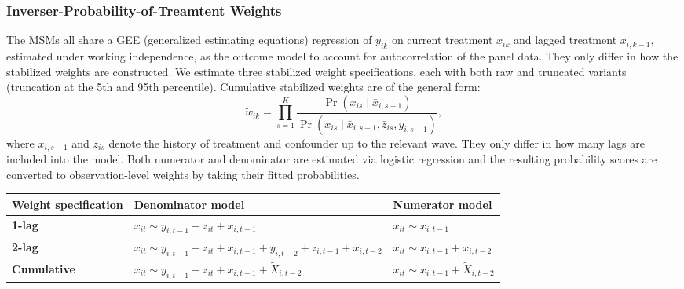 \documentclass[
  letterpaper,
  DIV=11,
  numbers=noendperiod]{scrartcl}
\newcounter{none} %
\begin{document}
\subsubsection{Inverser-Probability-of-Treamtent
Weights}\label{inverser-probability-of-treamtent-weights}

The MSMs all share a GEE (generalized estimating equations) regression
of \(y_{ik}\) on current treatment \(x_{ik}\) and lagged treatment
\(x_{i,k-1}\), estimated under working independence, as the outcome
model to account for autocorrelation of the panel data. They only differ
in how the stabilized weights are constructed. We estimate three
stabilized weight specifications, each with both raw and truncated
variants (truncation at the 5th and 95th percentile). Cumulative
stabilized weights are of the general form:
\[ \tilde w_{ik} = \prod_{s=1}^K \frac{\Pr(x_{is} \mid \bar x_{i, s-1})}{\Pr(x_{is} \mid \bar x_{i, s-1}, \bar z_{is}, y_{i, s-1})}, \]
where \(\bar x_{i, s-1}\) and \(\bar z_{is}\) denote the history of
treatment and confounder up to the relevant wave. They only differ in
how many lags are included into the model. Both numerator and
denominator are estimated via logistic regression and the resulting
probability scores are converted to observation-level weights by taking
their fitted probabilities.

{\def\LTcaptype{none} %
\begin{longtable}[]{@{}
  >{\raggedright\arraybackslash}p{}
  >{\raggedright\arraybackslash}p{}
  >{\raggedright\arraybackslash}p{}@{}}
\toprule\noalign{}
\begin{minipage}[b]{\linewidth}\raggedright
Weight specification
\end{minipage} & \begin{minipage}[b]{\linewidth}\raggedright
Denominator model
\end{minipage} & \begin{minipage}[b]{\linewidth}\raggedright
Numerator model
\end{minipage} \\
\midrule\noalign{}
\endhead
\bottomrule\noalign{}
\endlastfoot
\textbf{1-lag} & \(x_{it} \sim y_{i,t-1} + z_{it} + x_{i,t-1}\) &
\(x_{it} \sim x_{i,t-1}\) \\
\textbf{2-lag} &
\(x_{it} \sim y_{i,t-1} + z_{it} + x_{i,t-1} + y_{i,t-2} + z_{i,t-1} + x_{i,t-2}\)
& \(x_{it} \sim x_{i,t-1} + x_{i,t-2}\) \\
\textbf{Cumulative} &
\(x_{it} \sim y_{i,t-1} + z_{it} + x_{i,t-1} + \widetilde{X}_{i,t-2}\) &
\(x_{it} \sim x_{i,t-1} + \widetilde{X}_{i,t-2}\) \\
\end{longtable}
}
\end{document}
